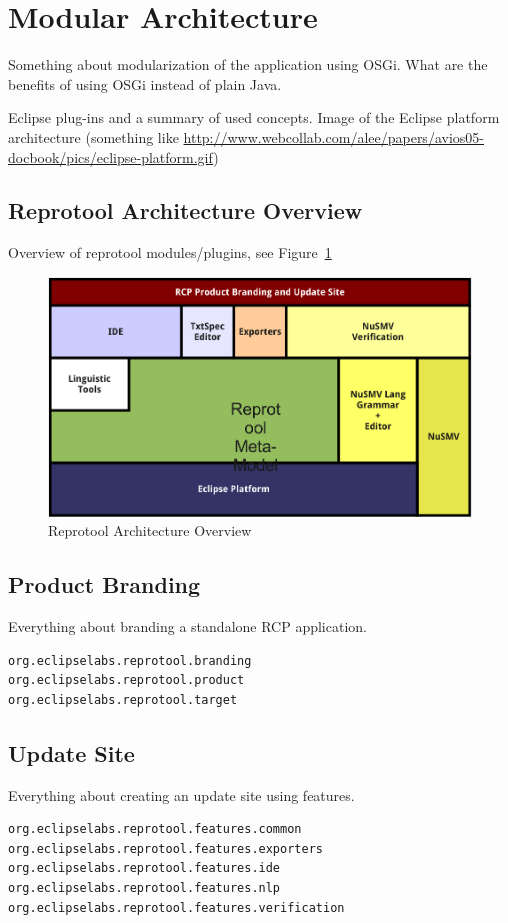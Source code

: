 \section{Modular Architecture}

Something about modularization of the application using OSGi.
What are the benefits of using OSGi instead of plain Java.

Eclipse plug-ins and a summary of used concepts.
Image of the Eclipse platform architecture (something like \url{http://www.webcollab.com/alee/papers/avios05-docbook/pics/eclipse-platform.gif})
	


\subsection{Reprotool Architecture Overview}
Overview of reprotool modules/plugins, see Figure~\ref{fig:ArchitectureOverview}
	
\begin{figure}[ht]
  \centering
  \includegraphics[width=\textwidth]{images/ArchitectureOverview}
  \caption{Reprotool Architecture Overview}
  \label{fig:ArchitectureOverview}
\end{figure}



\subsection{Product Branding}
Everything about branding a standalone RCP application.
\begin{verbatim}
org.eclipselabs.reprotool.branding
org.eclipselabs.reprotool.product
org.eclipselabs.reprotool.target
\end{verbatim}



\subsection{Update Site}
Everything about creating an update site using features.
\begin{verbatim}
org.eclipselabs.reprotool.features.common
org.eclipselabs.reprotool.features.exporters
org.eclipselabs.reprotool.features.ide
org.eclipselabs.reprotool.features.nlp
org.eclipselabs.reprotool.features.verification
\end{verbatim}
